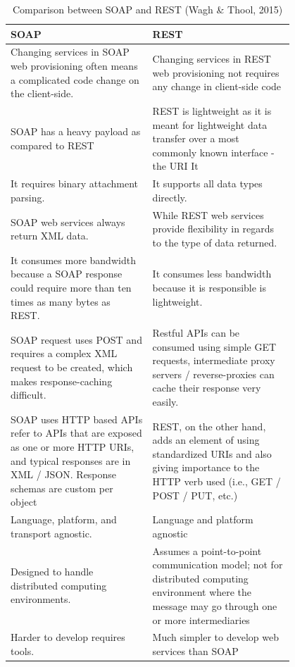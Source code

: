 \documentclass[conference]{IEEEtran}
\begin{document}
\begin{table}[!htbp]
	\centering
	\caption{Comparison between SOAP and REST (Wagh \& Thool, 2015)}
	\label{fig:compSoapRest}
	\begin{tabular}{| p{0.4\linewidth} | p{0.4\linewidth}|}\hline
		SOAP & REST \\\hline
		Changing services in SOAP web provisioning often means a complicated code change on the client-side. & Changing services in REST web provisioning not requires any change in client-side code\\\hline
		SOAP has a heavy payload as compared to REST & REST is lightweight as it is meant for lightweight data transfer over a most commonly known interface - the URI
		It\\\hline
		It requires binary attachment parsing. & It supports all data types directly.\\\hline
		SOAP web services always return XML data. & While REST web services provide flexibility in regards to the type of data returned.\\\hline
		It consumes more bandwidth because a SOAP response could require more than ten times as many bytes as REST. & It consumes less bandwidth because it is responsible is lightweight.\\\hline
		SOAP request uses POST and requires a complex XML request to be created, which makes response-caching difficult. & Restful APIs can be consumed using simple GET requests,
		intermediate proxy servers /
		reverse-proxies can cache their response very easily.\\\hline
		SOAP uses HTTP based APIs refer to APIs that are exposed as one or more HTTP URIs, and typical responses are in XML / JSON. Response schemas are custom per object & REST, on the other hand, adds an element of using standardized URIs and also giving importance to the HTTP verb used (i.e., GET / POST / PUT, etc.)\\\hline
		Language, platform, and transport agnostic. & Language and platform agnostic\\\hline
		Designed to handle distributed computing environments. & Assumes a point-to-point communication model; not for distributed computing environment where the message may go through one or more intermediaries\\\hline
		Harder to develop requires tools. & Much simpler to develop web services than SOAP\\\hline

\end{tabular}
\end{table}
\end{document}
